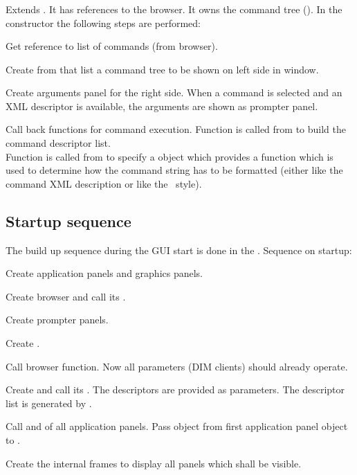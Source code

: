 \subsubsection{}
Extends .
It has references to the browser. It owns the command tree (). In the constructor
the following steps are performed:
\bnum
\item Get reference to list of commands (from browser).
\item Create from that list a command tree to be shown on left side in window.
\item Create arguments panel for the right side. When a command is selected and
an XML descriptor is available, the arguments are shown as prompter panel.
\item Call back functions for command execution.
\enum
Function  is called from  to build
the command descriptor list.\\
Function  is called from  to specify
a  object which provides a function 
which is used to determine how the command string has to be formatted (either
like the command XML description or like the \mbs\ style).
\subsection{Startup sequence}
The build up sequence during the GUI start 
is done in the .
Sequence on startup:
\bnum
\item Create application panels and graphics panels.
\item Create browser  and call its .
\item Create prompter panels.
\item Create .
\item Call browser  function. 
Now all parameters (DIM clients) should already operate.
\item Create  and call its .
The descriptors are provided as parameters. The descriptor list is
generated by .
\item Call  and  of all application panels. Pass
 object from first application panel object to .
\item Create the internal frames to display all panels which shall be visible.
\enum 
